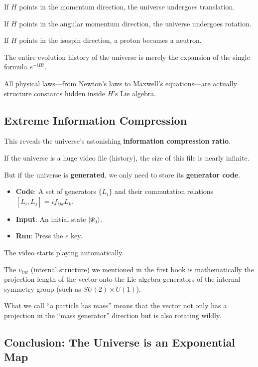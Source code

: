 If $H$ points in the momentum direction, the universe undergoes translation.

If $H$ points in the angular momentum direction, the universe undergoes rotation.

If $H$ points in the isospin direction, a proton becomes a neutron.

The entire evolution history of the universe is merely the expansion of the single formula \textbf{$e^{-iHt}$}.

All physical laws---from Newton's laws to Maxwell's equations---are actually structure constants hidden inside $H$'s Lie algebra.

\subsection{Extreme Information Compression}

This reveals the universe's astonishing \textbf{information compression ratio}.

If the universe is a huge video file (history), the size of this file is nearly infinite.

But if the universe is \textbf{generated}, we only need to store its \textbf{generator code}.

\begin{itemize}
\item \textbf{Code}: A set of generators $\{L_i\}$ and their commutation relations $[L_i, L_j] = i f_{ijk} L_k$.

\item \textbf{Input}: An initial state $|\Psi_0\rangle$.

\item \textbf{Run}: Press the $e$ key.
\end{itemize}

The video starts playing automatically.

The $v_{int}$ (internal structure) we mentioned in the first book is mathematically the projection length of the vector onto the Lie algebra generators of the internal symmetry group (such as $SU(2) \times U(1)$).

What we call ``a particle has mass'' means that the vector not only has a projection in the ``mass generator'' direction but is also rotating wildly.

\subsection{Conclusion: The Universe is an Exponential Map}

